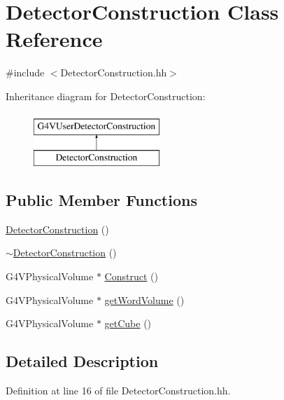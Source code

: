 \hypertarget{class_detector_construction}{\section{Detector\-Construction Class Reference}
\label{class_detector_construction}
}


{\ttfamily \#include $<$Detector\-Construction.\-hh$>$}

Inheritance diagram for Detector\-Construction\-:\begin{figure}[H]
\begin{center}
\leavevmode
\includegraphics[height=2.000000cm]{class_detector_construction}
\end{center}
\end{figure}
\subsection*{Public Member Functions}
\begin{DoxyCompactItemize}
\item 
\hyperlink{class_detector_construction_a1533c4308baddd0b2dcdf40f61dea1ef}{Detector\-Construction} ()
\item 
\hyperlink{class_detector_construction_a73013cab35a2b470338da2e4686edea3}{$\sim$\-Detector\-Construction} ()
\item 
G4\-V\-Physical\-Volume $\ast$ \hyperlink{class_detector_construction_a662c618480b345a747f014b845d5ffdf}{Construct} ()
\item 
G4\-V\-Physical\-Volume $\ast$ \hyperlink{class_detector_construction_ab3d0fbcccb1be35f505a78e7fd4ffce2}{get\-Word\-Volume} ()
\item 
G4\-V\-Physical\-Volume $\ast$ \hyperlink{class_detector_construction_af45ab5e73219e233c7c015573cf4f88f}{get\-Cube} ()
\end{DoxyCompactItemize}


\subsection{Detailed Description}


Definition at line 16 of file Detector\-Construction.\-hh.



